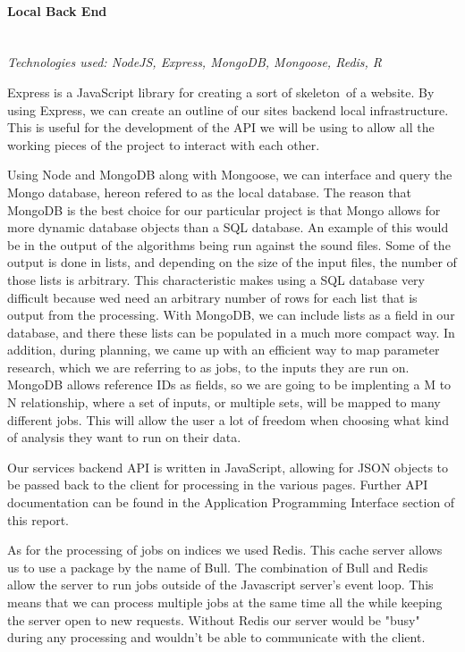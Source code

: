 \paragraph{Local Back End} \mbox{}\\
\textit{Technologies used: NodeJS, Express, MongoDB, Mongoose, Redis, R}\par
Express is a JavaScript library for creating a sort of \textquotesingle skeleton\textquotesingle\ of a website. By using Express, we can create an outline of our site\textquotesingle s backend local infrastructure. This is useful for the development of the API we will be using to allow all the working pieces of the project to interact with each other.\par
Using Node and MongoDB along with Mongoose, we can interface and query the Mongo database, hereon refered to as the local database. The reason that MongoDB is the best choice for our particular project is that Mongo allows for more dynamic database objects than a SQL database. An example of this would be in the output of the algorithms being run against the sound files. Some of the output is done in lists, and depending on the size of the input files, the number of those lists is arbitrary. This characteristic makes using a SQL database very difficult because we\textquotesingle d need an arbitrary number of rows for each list that is output from the processing. With MongoDB, we can include lists as a field in our database, and there these lists can be populated in a much more compact way. In addition, during planning, we came up with an efficient way to map parameter research, which we are referring to as jobs, to the inputs they are run on. MongoDB allows reference IDs as fields, so we are going to be implenting a M to N relationship, where a set of inputs, or multiple sets, will be mapped to many different jobs. This will allow the user a lot of freedom when choosing what kind of analysis they want to run on their data.\par
Our service\textquotesingle s backend API is written in JavaScript, allowing for JSON objects to be passed back to the client for processing in the various pages. Further API documentation can be found in the Application Programming Interface section of this report.\par
As for the processing of jobs on indices we used Redis. This cache server allows us to use a package by the name of Bull. The combination of Bull and Redis allow the server to run jobs outside of the Javascript server's event loop. This means that we can process multiple jobs at the same time all the while keeping the server open to new requests. Without Redis our server would be "busy" during any processing and wouldn't be able to communicate with the client.\par
